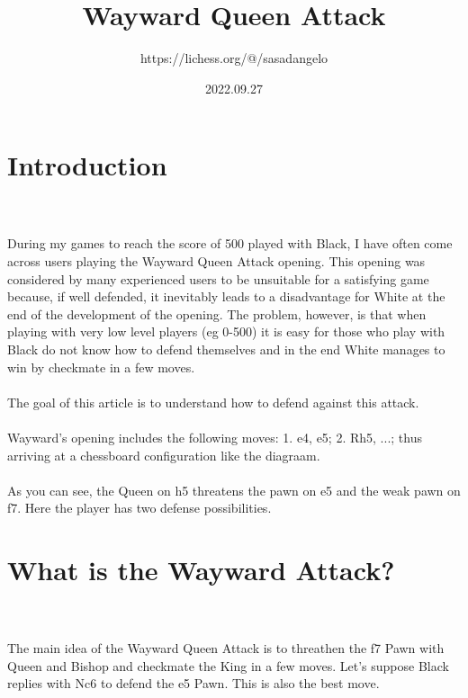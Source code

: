\documentclass{article}
\title{Wayward Queen Attack}
\author{https://lichess.org/@/sasadangelo}
\date{2022.09.27}
\begin{document}
\begin{titlepage}
\maketitle
\end{titlepage}
\section{ Introduction}

\\
\\
During my games to reach the score of 500 played with Black, I have often come across users playing the Wayward Queen Attack opening. This opening was considered by many experienced users to be unsuitable for a satisfying game because, if well defended, it inevitably leads to a disadvantage for White at the end of the development of the opening. The problem, however, is that when playing with very low level players (eg 0-500) it is easy for those who play with Black do not know how to defend themselves and in the end White manages to win by checkmate in a few moves.\\\\The goal of this article is to understand how to defend against this attack.\\\\Wayward's opening includes the following moves: 1. e4, e5; 2. Rh5, ...; thus arriving at a chessboard configuration like the diagraam.\\\\As you can see, the Queen on h5 threatens the pawn on e5 and the weak pawn on f7. Here the player has two defense possibilities.\\\section{ What is the Wayward Attack?}

\\
\\
The main idea of the Wayward Queen Attack is to threathen the f7 Pawn with Queen and Bishop and checkmate the King in a few moves. Let's suppose Black replies with Nc6 to defend the e5 Pawn. This is also the best move.\\\\
\\

\end{document}
